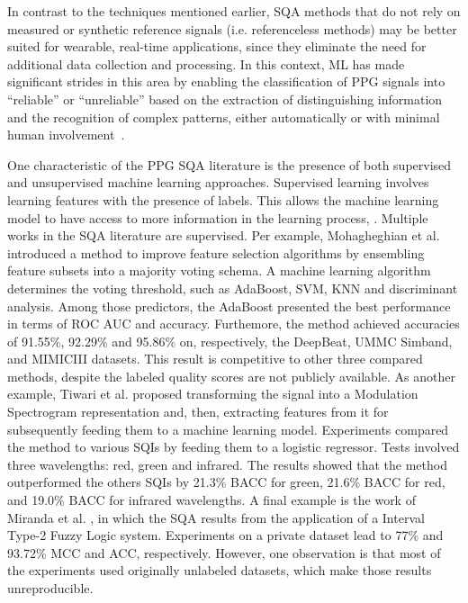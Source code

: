 In contrast to the techniques mentioned earlier, \gls{SQA} methods that do not rely on measured or synthetic reference signals (i.e. referenceless methods) may be better suited for wearable, real-time applications, since they eliminate the need for additional data collection and processing. In this context, \gls{ML} has made significant strides in this area by enabling the classification of \gls{PPG} signals into ``reliable'' or ``unreliable'' based on the extraction of distinguishing information and the recognition of complex patterns, either automatically or with minimal human involvement~\cite{janiesch2021machine}. 


		
One characteristic of the \gls{PPG} \gls{SQA} literature is the presence of both supervised and unsupervised machine learning approaches. Supervised learning involves learning features with the presence of labels. This allows the machine learning model to have access to more information in the learning process, . Multiple works in the \gls{SQA} literature are supervised. Per example, Mohagheghian et al. \cite{ppg-sqa-1} introduced a method to improve feature selection algorithms by ensembling feature subsets into a majority voting schema. A machine learning algorithm determines the voting threshold, such as AdaBoost, \gls{SVM}, \gls{KNN} and discriminant analysis. Among those predictors, the AdaBoost presented the best performance in terms of \gls{ROC AUC} and accuracy. Furthemore, the method achieved accuracies of 91.55\%, 92.29\% and 95.86\% on, respectively, the DeepBeat, UMMC Simband, and MIMICIII datasets. This result is competitive to other three compared methods, despite the labeled quality scores are not publicly available. As another example, Tiwari et al. \cite{ppg-sqa-2} proposed transforming the signal into a Modulation Spectrogram representation and, then, extracting features from it for subsequently feeding them to a machine learning model. Experiments compared the method to various \glspl{SQI} by feeding them to a logistic regressor. Tests involved three wavelengths: red, green and infrared. The results showed that the method outperformed the others \glspl{SQI} by 21.3\% \gls{BACC} for green, 21.6\% \gls{BACC} for red, and 19.0\% \gls{BACC} for infrared wavelengths. A final example is the work of Miranda et al. \cite{ppg-sqa-3}, in which the \gls{SQA} results from the application of a Interval Type-2 Fuzzy Logic system. Experiments on a private dataset lead to 77\% and 93.72\% \gls{MCC} and \gls{ACC}, respectively. However, one observation is that most of the experiments used originally unlabeled datasets, which make those results unreproducible. 
	
